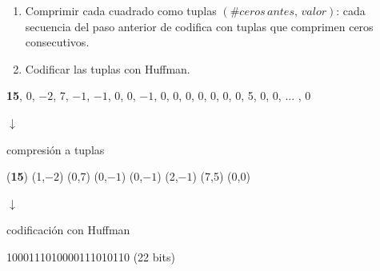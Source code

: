 \documentclass{beamer}
\begin{document}
\begin{frame}
    \begin{enumerate}\addtocounter{enumi}{2}
        \item Comprimir cada cuadrado como tuplas $(\# ceros \, antes, \, valor)$: cada secuencia del paso anterior de codifica con tuplas que comprimen ceros consecutivos.

        \item Codificar las tuplas con Huffman.
    \end{enumerate}

    \vfill
    \begin{center}
        \textbf{15}, {\color{red} 0}, $-2$, 7, $-1$, $-1$, {\color{red} 0}, {\color{red} 0}, $-1$, {\color{red} 0}, {\color{red} 0}, {\color{red} 0}, {\color{red} 0}, {\color{red} 0}, {\color{red} 0}, {\color{red} 0}, 5, {\color{red} 0}, {\color{red} 0}, ... , {\color{red} 0}

        \vfill
        $\downarrow$

        {\tiny compresión a tuplas}
        \vfill

        (\textbf{15}) ({\color{red}1},$-2$) ({\color{red}0},7) ({\color{red}0},$-1$) ({\color{red}0},$-1$) ({\color{red}2},$-1$) ({\color{red}7},5) {\color{red}(0,0)}

        \vfill
        $\downarrow$

        {\tiny codificación con Huffman}
        \vfill

        1000111010000111010110 (22 bits)
    \end{center}
\end{frame}
\end{document}
